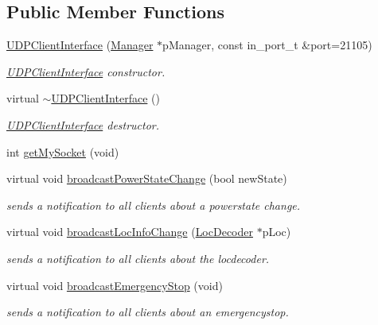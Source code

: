 \subsection*{Public Member Functions}
\begin{DoxyCompactItemize}
\item 
\hyperlink{classTBT_1_1UDPClientInterface_ad03356f6abf16596c181851e9fcaf7a9_ad03356f6abf16596c181851e9fcaf7a9}{U\+D\+P\+Client\+Interface} (\hyperlink{classTBT_1_1Manager}{Manager} $\ast$p\+Manager, const in\+\_\+port\+\_\+t \&port=21105)
\begin{DoxyCompactList}\small\item\em \hyperlink{classTBT_1_1UDPClientInterface}{U\+D\+P\+Client\+Interface} constructor. \end{DoxyCompactList}\item 
virtual \hyperlink{classTBT_1_1UDPClientInterface_af3361cf4ee8f6ab5a854f34cd1377f0e_af3361cf4ee8f6ab5a854f34cd1377f0e}{$\sim$\+U\+D\+P\+Client\+Interface} ()
\begin{DoxyCompactList}\small\item\em \hyperlink{classTBT_1_1UDPClientInterface}{U\+D\+P\+Client\+Interface} destructor. \end{DoxyCompactList}\item 
int \hyperlink{classTBT_1_1UDPClientInterface_ac25b06823d045631f3c7b76e9c50f22e_ac25b06823d045631f3c7b76e9c50f22e}{get\+My\+Socket} (void)
\item 
virtual void \hyperlink{classTBT_1_1UDPClientInterface_a60ddc3657a12b4e6c7ef7db0a31c9e3c_a60ddc3657a12b4e6c7ef7db0a31c9e3c}{broadcast\+Power\+State\+Change} (bool new\+State)
\begin{DoxyCompactList}\small\item\em sends a notification to all clients about a powerstate change. \end{DoxyCompactList}\item 
virtual void \hyperlink{classTBT_1_1UDPClientInterface_af4e63115b3156b151d4dfd50342b36e7_af4e63115b3156b151d4dfd50342b36e7}{broadcast\+Loc\+Info\+Change} (\hyperlink{classTBT_1_1LocDecoder}{Loc\+Decoder} $\ast$p\+Loc)
\begin{DoxyCompactList}\small\item\em sends a notification to all clients about the locdecoder. \end{DoxyCompactList}\item 
virtual void \hyperlink{classTBT_1_1UDPClientInterface_a33a0c51d141a457cda9dacc4d82d5304_a33a0c51d141a457cda9dacc4d82d5304}{broadcast\+Emergency\+Stop} (void)
\begin{DoxyCompactList}\small\item\em sends a notification to all clients about an emergencystop. \end{DoxyCompactList}\end{DoxyCompactItemize}
